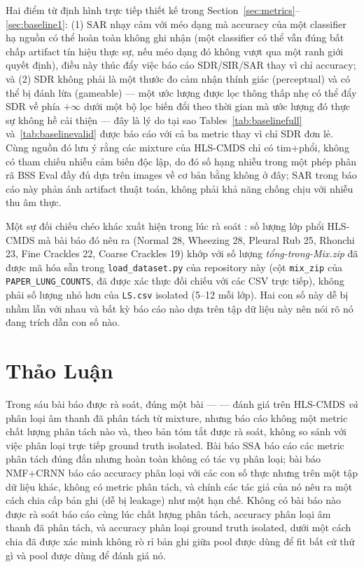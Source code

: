 \documentclass[11pt]{article}
\begin{document}
Hai điểm từ \cite{vincent2006} định hình trực tiếp thiết kế trong
Section~\ref{sec:metrics}--\ref{sec:baseline1}: (1) SAR nhạy cảm với méo
dạng mà accuracy của một classifier hạ nguồn có thể hoàn toàn không ghi
nhận (một classifier có thể vẫn đúng bất chấp artifact tín hiệu thực sự,
nếu méo dạng đó không vượt qua một ranh giới quyết định), điều này thúc
đẩy việc báo cáo SDR/SIR/SAR thay vì chỉ accuracy; và (2) SDR không phải
là một thước đo cảm nhận thính giác (perceptual) và có thể bị đánh lừa
(gameable) --- một ước lượng được lọc thông thấp nhẹ có thể đẩy SDR về
phía $+\infty$ dưới một bộ lọc biến đổi theo thời gian mà ước lượng đó
thực sự không hề cải thiện --- đây là lý do tại sao
Tables~\ref{tab:baselinefull} và~\ref{tab:baselinevalid} được báo cáo
với cả ba metric thay vì chỉ SDR đơn lẻ. Cùng nguồn đó lưu ý rằng các
mixture của HLS-CMDS chỉ có tim+phổi, không có tham chiếu nhiễu cảm biến
độc lập, do đó số hạng nhiễu trong một phép phân rã BSS Eval đầy đủ dựa
trên images về cơ bản bằng không ở đây; SAR trong báo cáo này phản ánh
artifact thuật toán, không phải khả năng chống chịu với nhiễu thu âm
thực.

Một sự đối chiếu chéo khác xuất hiện trong lúc rà soát \cite{edgelung}:
số lượng lớp phổi HLS-CMDS mà bài báo đó nêu ra (Normal 28, Wheezing 28,
Pleural Rub 25, Rhonchi 23, Fine Crackles 22, Coarse Crackles 19) khớp
với số lượng \emph{tổng-trong-Mix.zip} đã được mã hóa sẵn trong
\texttt{load\_dataset.py} của repository này (cột \texttt{mix\_zip} của
\texttt{PAPER\_LUNG\_COUNTS}, đã được xác thực đối chiếu với các CSV
trực tiếp), không phải số lượng nhỏ hơn của \texttt{LS.csv} isolated
(5--12 mỗi lớp). Hai con số này dễ bị nhầm lẫn với nhau và bất kỳ báo
cáo nào dựa trên tập dữ liệu này nên nói rõ nó đang trích dẫn con số
nào.

\section{Thảo Luận}
\label{sec:discussion}
Trong sáu bài báo được rà soát, đúng một bài --- \cite{edgelung} ---
đánh giá trên HLS-CMDS \emph{và} phân loại âm thanh đã phân tách từ
mixture, nhưng báo cáo không một metric chất lượng phân tách nào và,
theo bản tóm tắt được rà soát, không so sánh với việc phân loại trực
tiếp ground truth isolated. Bài báo SSA \cite{ssa} báo cáo các metric
phân tách đúng đắn nhưng hoàn toàn không có tác vụ phân loại; bài báo
NMF+CRNN \cite{nmfcrnn} báo cáo accuracy phân loại với các con số thực
nhưng trên một tập dữ liệu khác, không có metric phân tách, và chính các
tác giả của nó nêu ra một cách chia cấp bản ghi (dễ bị leakage) như một
hạn chế. Không có bài báo nào được rà soát báo cáo cùng lúc chất lượng
phân tách, accuracy phân loại âm thanh đã phân tách, và accuracy phân
loại ground truth isolated, dưới một cách chia đã được xác minh không rò
rỉ bản ghi giữa pool được dùng để fit bất cứ thứ gì và pool được dùng để
đánh giá nó.
\end{document}
